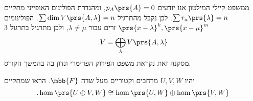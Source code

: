 \documentclass[article, 10pt,oneside]{article}
\begin{document}
\begin{remark}
ממשפט קיילי המילטון אנו יודעים
$p_A\prs{A} = 0$,
ומהגדרת הפולינום האופייני מתקיים
$\sum r_a\prs{\lambda} = n$.
לכן נקבל מהתרגיל
$\sum \dim V\prs{A, \lambda} = n$.
הפולינומים
$\prs{x - \lambda}^k, \prs{x-\mu}^m$
זרים עבור
$\lambda \neq \mu$,
ולכן מתרגיל בתרגול 3
\[\text{.} V = \bigoplus_{\lambda} V\prs{A, \lambda}\]
מסקנה זאת נקראת משפט הפירוק הפרימרי ונדון בה בהמשך הקורס.
\end{remark}

\begin{exercise}
יהיו
$U,V,W$
מרחבים וקטוריים מעל שדה
$\mbb{F}$.
הראו שמתקיים
\[\text{.} \hom\prs{U \oplus V, W} \cong \hom\prs{U, W} \oplus \hom\prs{V,W}\]
\end{exercise}

\begin{solution}

\end{solution}
\end{document}

